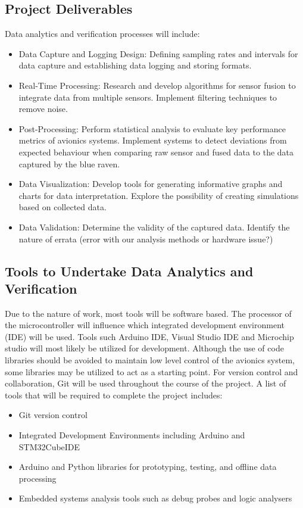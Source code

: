 \subsection{Project Deliverables}
Data analytics and verification processes will include:  
\begin{itemize}
  \item Data Capture and Logging Design: Defining sampling rates and intervals for data capture and establishing data logging and storing formats. 
  \item Real-Time Processing: Research and develop algorithms for sensor fusion to integrate data from multiple sensors. Implement filtering techniques to remove noise. 
  \item Post-Processing: Perform statistical analysis to evaluate key performance metrics of avionics systems. Implement systems to detect deviations from expected behaviour when comparing raw sensor and fused data to the data captured by the blue raven.     
  \item Data Visualization: Develop tools for generating informative graphs and charts for data interpretation. Explore the possibility of creating simulations based on collected data. 
  \item Data Validation: Determine the validity of the captured data. Identify the nature of errata (error with our analysis methods or hardware issue?) 
\end{itemize}


\subsection{Tools to Undertake Data Analytics and Verification}
Due to the nature of work, most tools will be software based. The processor of the microcontroller will influence which integrated development environment (IDE) will be used. Tools such Arduino IDE, Visual Studio IDE and Microchip studio will most likely be utilized for development. Although the use of code libraries should be avoided to maintain low level control of the avionics system, some libraries may be utilized to act as a starting point. For version control and collaboration, Git will be used throughout the course of the project. A list of tools that will be required to complete the project includes:

\begin{itemize}
  \item Git version control
  \item Integrated Development Environments including Arduino and STM32CubeIDE
  \item Arduino and Python libraries for prototyping, testing, and offline data processing 
  \item Embedded systems analysis tools such as debug probes and logic analysers
\end{itemize}

